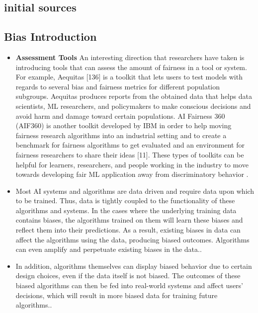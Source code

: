 	\begin{refsection}
		
		
		\section{initial sources}
		
					\rawcitationstart
		\subsection{Bias Introduction}
		\begin{itemize}
			\item \textbf{Assessment Tools} An interesting direction that researchers have taken is introducing tools that can assess the amount of fairness in a tool or system. For example, Aequitas [136] is a toolkit that lets users to test models with regards to several bias and fairness metrics for different population subgroups. Aequitas produces reports from the obtained data that helps data scientists, \gls{ML} researchers, and policymakers to make conscious decisions and avoid harm and damage toward certain populations. \gls{AI} Fairness 360 (AIF360) is another toolkit developed by IBM in order to help moving fairness research algorithms into an industrial setting and to create a benchmark for fairness algorithms to get evaluated and an environment for fairness researchers to share their ideas [11]. These types of toolkits can be helpful for learners, researchers, and people working in the industry to move towards developing fair \gls{ML} application away from discriminatory behavior \autocite{Mehrabi_2021}.
		\end{itemize}	
		
		\begin{itemize}
			\item Most \gls{AI} systems and algorithms are data driven and require data upon which to be trained. Thus, data is tightly coupled to the functionality of these algorithms and systems. In the cases where the underlying training data contains biases, the algorithms trained on them will learn these biases and reflect them into their predictions. As a result, existing biases in data can affect the algorithms using the data, producing biased outcomes. Algorithms can even amplify and perpetuate existing biases in the data.\autocite{Mehrabi_2021}.
			\item In addition, algorithms themselves can display biased behavior due to certain design choices, even if the data itself is not biased. The outcomes of these biased algorithms can then be fed into real-world systems and affect users’ decisions, which will result in more biased data for training future algorithms.\autocite{Mehrabi_2021}.
			

\end{itemize}
\end{refsection}
